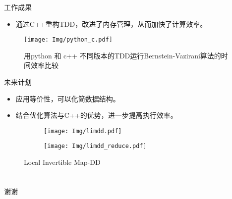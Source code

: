 \documentclass[aspectratio=1610]{ctexbeamer}
\begin{document}
\begin{frame}{工作成果}
    \begin{itemize}[label=$\bullet$]
        \item 通过C++重构TDD，改进了内存管理，从而加快了计算效率。
    \end{itemize}
    \begin{figure}
        \texttt{[image: Img/python\_c.pdf]}
        \caption{用python 和 c++ 不同版本的TDD运行Bernstein-Vazirani算法的时间效率比较}
    \end{figure}
\end{frame}
\begin{frame}{未来计划}
    \begin{itemize}[label=$\bullet$]
        \item 应用等价性，可以化简数据结构。
        \item 结合优化算法与C++的优势，进一步提高执行效率。
    \end{itemize}
    \begin{figure}
        \begin{subfigure}{0.4\textwidth}
            \centering
            \texttt{[image: Img/limdd.pdf]}
        \end{subfigure}
        \begin{subfigure}{0.4\textwidth}
            \centering
            \texttt{[image: Img/limdd\_reduce.pdf]}
        \end{subfigure}
        \caption{Local Invertible Map-DD}
    \end{figure}
\end{frame}

\section*{}
\begin{frame}
    \centering
    \Huge 谢谢
\end{frame}
\end{document}
